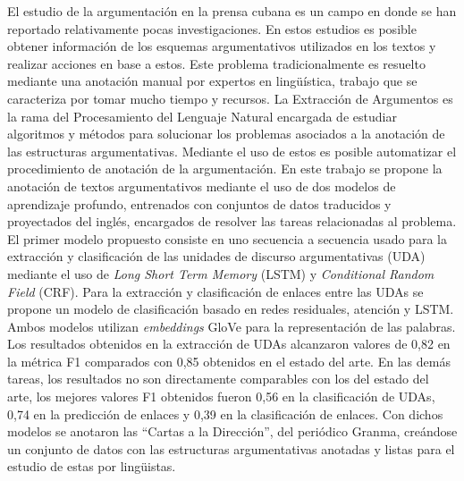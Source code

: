 \begin{resumen}


El estudio de la argumentación en la prensa cubana es un campo en donde se han reportado
relativamente pocas investigaciones. En estos estudios es posible obtener 
información de los esquemas argumentativos utilizados en los textos y
realizar acciones en base a estos.
Este problema tradicionalmente es resuelto mediante 
una anotación manual por expertos en lingüística, trabajo que se 
caracteriza por tomar mucho tiempo y recursos. La Extracción
de Argumentos es la rama del Procesamiento del Lenguaje Natural
encargada de estudiar algoritmos y métodos para solucionar los problemas
asociados a la anotación de las estructuras argumentativas. Mediante el uso 
de estos es posible automatizar el procedimiento de anotación
de la argumentación. 
En este trabajo se propone la anotación de textos argumentativos
mediante el uso de dos modelos de aprendizaje profundo, entrenados con 
conjuntos de datos traducidos y proyectados del inglés, encargados de resolver
las tareas relacionadas al problema. 
El primer modelo propuesto 
consiste en uno secuencia a secuencia usado para la extracción y clasificación
de las unidades de discurso argumentativas (UDA) mediante el uso de \emph{Long Short Term Memory} 
(LSTM) y \emph{Conditional Random Field} (CRF). Para la extracción y clasificación de 
enlaces entre las UDAs se propone un modelo de clasificación basado en redes residuales,
atención y LSTM. Ambos modelos utilizan \emph{embeddings} GloVe para la representación 
de las palabras. Los resultados obtenidos en la extracción de UDAs alcanzaron valores de
0,82 en la métrica F1 comparados con 0,85 obtenidos en el estado del arte. 
En las demás tareas, los resultados no son directamente comparables con los del estado del arte, 
los mejores valores F1 obtenidos fueron 0,56 en la clasificación de UDAs, 0,74 en la predicción
de enlaces y 0,39 en la clasificación de enlaces.
Con dichos modelos se anotaron las ``Cartas a la Dirección'', del 
periódico Granma, creándose un conjunto de datos con las estructuras argumentativas anotadas
y listas para el estudio de estas por lingüistas.

\end{resumen}

